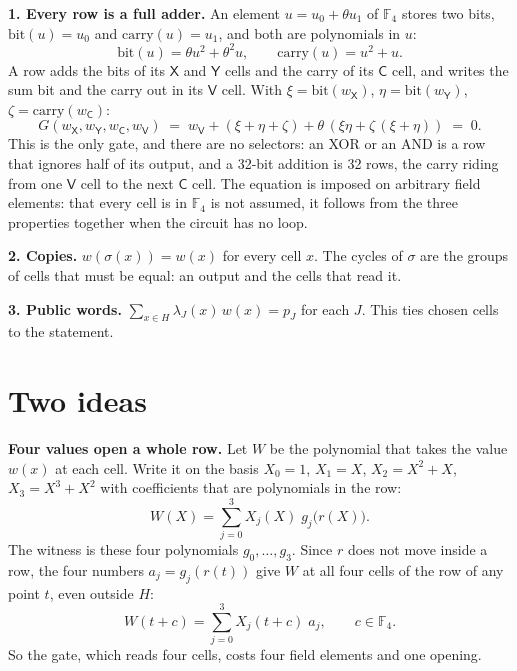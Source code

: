 \documentclass[11pt]{article}
\newcommand{\F}{\mathbb{F}}
\newcommand{\cX}{\mathsf{X}}
\newcommand{\cY}{\mathsf{Y}}
\newcommand{\cC}{\mathsf{C}}
\newcommand{\cV}{\mathsf{V}}
\newcommand{\bit}{\mathrm{bit}}
\newcommand{\car}{\mathrm{carry}}
\newcommand{\head}[1]{\par\vspace{0.35em}\textbf{#1}\enspace}
\begin{document}
\head{1. Every row is a full adder.} An element $u = u_0 + \theta u_1$ of $\F_4$ stores two bits, $\bit(u) = u_0$ and $\car(u) = u_1$, and both are polynomials in $u$:
\[
  \bit(u) = \theta u^2 + \theta^2 u, \qquad \car(u) = u^2 + u .
\]
A row adds the bits of its $\cX$ and $\cY$ cells and the carry of its $\cC$ cell, and writes the sum bit and the carry out in its $\cV$ cell. With $\xi = \bit(w_\cX)$, $\eta = \bit(w_\cY)$, $\zeta = \car(w_\cC)$:
\begin{equation}\label{eq:G}
  G(w_\cX, w_\cY, w_\cC, w_\cV) \;=\; w_\cV + (\xi + \eta + \zeta) + \theta \, (\xi \eta + \zeta \, (\xi + \eta)) \;=\; 0 .
\end{equation}
This is the only gate, and there are no selectors: an XOR or an AND is a row that ignores half of its output, and a 32-bit addition is 32 rows, the carry riding from one $\cV$ cell to the next $\cC$ cell. The equation is imposed on arbitrary field elements: that every cell is in $\F_4$ is not assumed, it follows from the three properties together when the circuit has no loop.

\head{2. Copies.} $w(\sigma(x)) = w(x)$ for every cell $x$. The cycles of $\sigma$ are the groups of cells that must be equal: an output and the cells that read it.

\head{3. Public words.} $\sum_{x \in H} \lambda_J(x) \, w(x) = p_J$ for each $J$. This ties chosen cells to the statement.

\section{Two ideas}

\head{Four values open a whole row.} Let $W$ be the polynomial that takes the value $w(x)$ at each cell. Write it on the basis $X_0 = 1$, $X_1 = X$, $X_2 = X^2 + X$, $X_3 = X^3 + X^2$ with coefficients that are polynomials in the row:
\[
  W(X) = \sum_{j=0}^{3} X_j(X) \; g_j\bigl(r(X)\bigr) .
\]
The witness is these four polynomials $g_0, \dots, g_3$. Since $r$ does not move inside a row, the four numbers $a_j = g_j(r(t))$ give $W$ at all four cells of the row of any point $t$, even outside $H$:
\begin{equation}\label{eq:row}
  W(t + c) = \sum_{j=0}^{3} X_j(t + c) \; a_j , \qquad c \in \F_4 .
\end{equation}
So the gate, which reads four cells, costs four field elements and one opening.
\end{document}
